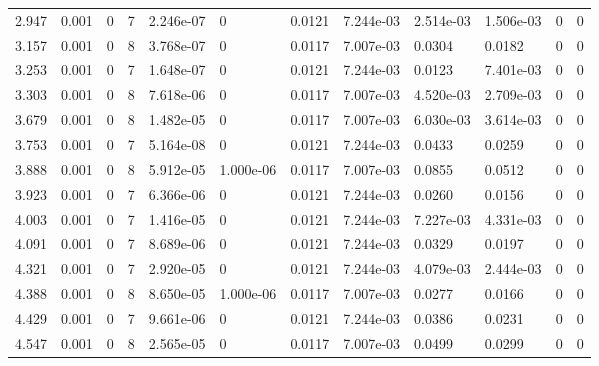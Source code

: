 \documentclass[preview]{standalone}
\begin{document}
{{\begin{tabular}{L{1.2cm}C{1.2cm} C{0.3cm}C{0.5cm} C{1.4cm}C{1.4cm} C{1.4cm}C{1.4cm} C{1.6cm}C{1.6cm} C{1.6cm}C{1.6cm}}
  2.947  &  0.001  & 0     &  7 &  2.246e-07  & 0  &  0.0121&   7.244e-03& 2.514e-03 & 1.506e-03   &  0 & 0  \\ 
  3.157  &  0.001  & 0     &  8 &  3.768e-07  & 0  &  0.0117&   7.007e-03& 0.0304 & 0.0182   &  0 & 0  \\ 
  3.253  &  0.001  & 0     &  7 &  1.648e-07  & 0  &  0.0121&   7.244e-03& 0.0123 & 7.401e-03   &  0 & 0  \\ 
  3.303  &  0.001  & 0     &  8 &  7.618e-06  & 0  &  0.0117&   7.007e-03& 4.520e-03 & 2.709e-03   &  0 & 0  \\ 
  3.679  &  0.001  & 0     &  8 &  1.482e-05  & 0  &  0.0117&   7.007e-03& 6.030e-03 & 3.614e-03   &  0 & 0  \\ 
  3.753  &  0.001  & 0     &  7 &  5.164e-08  & 0  &  0.0121&   7.244e-03& 0.0433 & 0.0259   &  0 & 0  \\ 
  3.888  &  0.001  & 0     &  8 &  5.912e-05  & 1.000e-06  &  0.0117&   7.007e-03& 0.0855 & 0.0512   &  0 & 0  \\ 
  3.923  &  0.001  & 0     &  7 &  6.366e-06  & 0  &  0.0121&   7.244e-03& 0.0260 & 0.0156   &  0 & 0  \\ 
  4.003  &  0.001  & 0     &  7 &  1.416e-05  & 0  &  0.0121&   7.244e-03& 7.227e-03 & 4.331e-03   &  0 & 0  \\ 
  4.091  &  0.001  & 0     &  7 &  8.689e-06  & 0  &  0.0121&   7.244e-03& 0.0329 & 0.0197   &  0 & 0  \\ 
  4.321  &  0.001  & 0     &  7 &  2.920e-05  & 0  &  0.0121&   7.244e-03& 4.079e-03 & 2.444e-03   &  0 & 0  \\ 
  4.388  &  0.001  & 0     &  8 &  8.650e-05  & 1.000e-06  &  0.0117&   7.007e-03& 0.0277 & 0.0166   &  0 & 0  \\ 
  4.429  &  0.001  & 0     &  7 &  9.661e-06  & 0  &  0.0121&   7.244e-03& 0.0386 & 0.0231   &  0 & 0  \\ 
  4.547  &  0.001  & 0     &  8 &  2.565e-05  & 0  &  0.0117&   7.007e-03& 0.0499 & 0.0299   &  0 & 0  \\ 
\hline 
\end{tabular} 

}}
\end{document}
